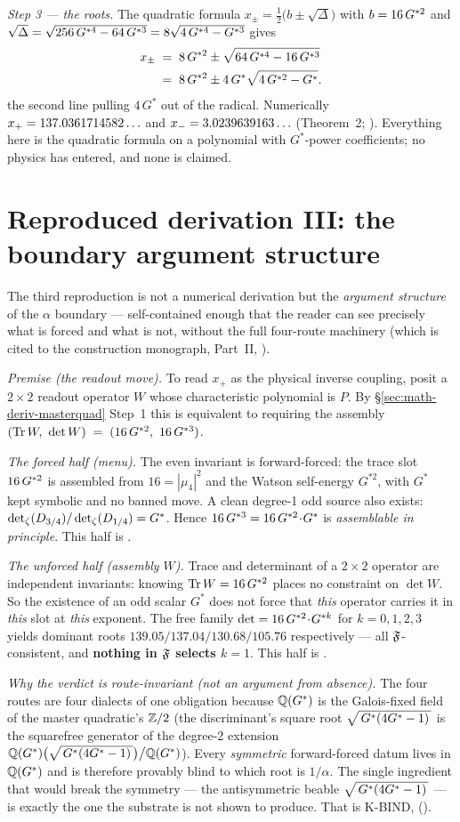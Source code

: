\emph{Step 3 --- the roots.} The quadratic formula $x_\pm=\tfrac12\bigl(b\pm\sqrt\Delta\bigr)$
with $b=16\,G^{*2}$ and $\sqrt\Delta=\sqrt{256\,G^{*4}-64\,G^{*3}}=8\sqrt{4\,G^{*4}-G^{*3}}$
gives
\[
  \begin{aligned} x_{\pm} &\;=\; 8\,G^{*2} \pm \sqrt{64\,G^{*4} - 16\,G^{*3}} \\ &\;=\; 8\,G^{*2} \pm 4\,G^{*}\sqrt{4\,G^{*2} - G^{*}}. \end{aligned}
\]
the second line pulling $4\,G^{*}$ out of the radical. Numerically
$x_+=137.0361714582\ldots$ and $x_-=3.0239639163\ldots$  (Theorem~2; ).
Everything here is the quadratic formula on a polynomial with $G^{*}$-power
coefficients; no physics has entered, and none is claimed.

\section{Reproduced derivation III: the boundary argument structure}
\label{sec:math-deriv-boundary}

The third reproduction is not a numerical derivation but the \emph{argument
structure} of the $\alpha$ boundary --- self-contained enough that the reader
can see precisely what is forced and what is not, without the full four-route
machinery (which is cited to the construction monograph, Part~II, ).

\emph{Premise (the readout move).} To read $x_+$ as the physical inverse
coupling, posit a $2\times2$ readout operator $W$ whose characteristic
polynomial is $P$. By \S\ref{sec:math-deriv-masterquad} Step~1 this is
equivalent to requiring the assembly $(\operatorname{Tr} W,\ \det W) \;=\; (16\,G^{*2},\ 16\,G^{*3})$.

\emph{The forced half (menu).} The even invariant is forward-forced: the
trace slot $16\,G^{*2}$ is assembled from $16=|\mu_4|^{2}$ and the Watson
self-energy $G^{*2}$, with $G^{*}$ kept symbolic and no banned move. A clean
degree-1 odd source also exists: $\operatorname{det}\nolimits_{\zeta}(D_{3/4})/\operatorname{det}\nolimits_{\zeta}(D_{1/4})=G^{*}$. Hence
$16\,G^{*3}=16\,G^{*2}\!\cdot\!G^{*}$ is \emph{assemblable in principle}. This half
is .

\emph{The unforced half (assembly $W$).} Trace and determinant of a $2\times2$
operator are independent invariants: knowing $\operatorname{Tr} W=16\,G^{*2}$ places no
constraint on $\det W$. So the existence of an odd scalar $G^{*}$ does not force
that \emph{this} operator carries it in \emph{this} slot at \emph{this}
exponent. The free family $\det=16\,G^{*2}\!\cdot\!G^{*k}$ for $k=0,1,2,3$ yields
dominant roots $139.05/137.04/130.68/105.76$ respectively --- all
$\mathfrak{F}$-consistent, and \textbf{nothing in $\mathfrak{F}$ selects $k=1$}. This
half is .

\emph{Why the verdict is route-invariant (not an argument from absence).} The
four routes are four dialects of one obligation because $\mathbb{Q}(G^{*})$ is the
Galois-fixed field of the master quadratic's $\mathbb{Z}/2$ (the discriminant's
square root $\sqrt{\,G^{*}(4G^{*} - 1)\,}$ is the squarefree generator of the degree-2 extension
$\mathbb{Q}(G^{*})\bigl(\sqrt{\,G^{*}(4G^{*} - 1)\,}\bigr)\big/\mathbb{Q}(G^{*})$). Every \emph{symmetric} forward-forced datum lives in $\mathbb{Q}(G^{*})$
and is therefore provably blind to which root is $1/\alpha$. The single
ingredient that would break the symmetry --- the antisymmetric beable $\sqrt{\,G^{*}(4G^{*} - 1)\,}$
--- is exactly the one the substrate is not shown to produce. That is K-BIND,
 ().

